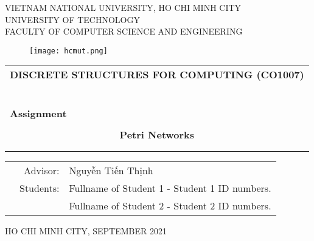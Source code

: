 \documentclass[a4paper]{article}
\begin{document}
\begin{titlepage}
\begin{center}
VIETNAM NATIONAL UNIVERSITY, HO CHI MINH CITY \\
UNIVERSITY OF TECHNOLOGY \\
FACULTY OF COMPUTER SCIENCE AND ENGINEERING
\end{center}

\vspace{1cm}

\begin{figure}[h!]
\begin{center}
\texttt{[image: hcmut.png]}
\end{center}
\end{figure}

\vspace{1cm}


\begin{center}
\begin{tabular}{c}
\multicolumn{1}{l}{\textbf{{\Large DISCRETE STRUCTURES FOR COMPUTING (CO1007)}}}\\
~~\\
\hline
\\
\multicolumn{1}{l}{\textbf{{\Large Assignment}}}\\
\\
\textbf{{\Huge Petri Networks}}\\
\\
\\
\hline
\end{tabular}
\end{center}

\vspace{3cm}

\begin{table}[h]
\begin{tabular}{rrl}
\hspace{5 cm} & Advisor: & Nguyễn Tiến Thịnh\\
& Students: & Fullname of Student 1 - Student 1 ID numbers. \\
& & Fullname of Student 2 - Student 2 ID numbers. \\
\end{tabular}
\end{table}

\begin{center}
{\footnotesize HO CHI MINH CITY, SEPTEMBER 2021}
\end{center}
\end{titlepage}
\end{document}
